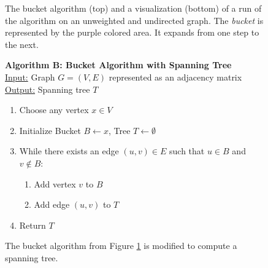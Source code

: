 \documentclass[a4paper]{exam}
\begin{document}
\begin{questions}
\begin{figure}
\begin{center}
  \end{center}
  \caption{The bucket algorithm (top) and a visualization (bottom) of a run of the algorithm on an unweighted and undirected graph. The \textit{bucket} is represented by the purple colored area. It expands from one step to the next.}
    \label{fig:bucket}
  \end{figure}
  \begin{figure}
    \begin{center}
    \begin{minipage}{.8\textwidth}
\textbf{Algorithm B: Bucket Algorithm with Spanning Tree}\\
\underline{Input:} Graph $G = (V, E)$ represented as an adjacency matrix\\
\underline{Output:} Spanning tree $T$

\begin{enumerate}
    \item Choose any vertex $x \in V$
    \item Initialize Bucket $B \leftarrow x$, Tree $T \leftarrow \emptyset$
    \item While there exists an edge $(u, v) \in E$ such that $u \in B$ and $v \not\in B$:
    \begin{enumerate}
        \item Add vertex $v$ to $B$
        \item Add edge $(u, v)$ to $T$
    \end{enumerate}
    \item Return $T$
\end{enumerate}      
    \end{minipage}
  \end{center}
  \caption{The bucket algorithm from Figure \ref{fig:bucket} is modified to compute a spanning tree.}
    \label{fig:bucketspan}
  \end{figure}

\end{questions}
\end{document}
